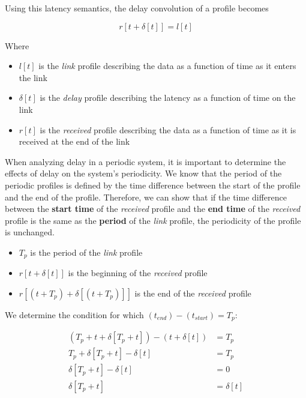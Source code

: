 Using this latency semantics, the delay convolution of a profile
becomes

\begin{equation}
  r[t + \delta[t]] = l[t]
\end{equation}

Where

\begin{itemize}
\item $l[t]$ is the \emph{link} profile describing the data as a
  function of time as it enters the link
\item $\delta[t]$ is the \emph{delay} profile describing the latency
  as a function of time on the link
\item $r[t]$ is the \emph{received} profile describing the data as a
  function of time as it is received at the end of the link
\end{itemize}
  
When analyzing delay in a periodic system, it is important to
determine the effects of delay on the system's periodicity.  We know
that the period of the periodic profiles is defined by the time
difference between the start of the profile and the end of the
profile.  Therefore, we can show that if the time difference between
the \textbf{start time} of the \emph{received} profile and the
\textbf{end time} of the \emph{received} profile is the same as the
\textbf{period} of the \emph{link} profile, the periodicity of the
profile is unchanged.

\begin{itemize}
\item $T_p$ is the period of the \emph{link} profile
\item $r[t + \delta[t]]$ is the beginning of the \emph{received}
  profile
\item $r[(t + T_p) + \delta[(t + T_p)]]$ is the end of the
  \emph{received} profile
\end{itemize}

We determine the condition for which $(t_{end}) - (t_{start}) =
T_p$:

\begin{equation}
  \begin{split}
    (T_p + t + \delta[T_p + t]) - (t + \delta[t]) &= T_p \\
    T_p + \delta[T_p + t] - \delta[t] &= T_p \\
    \delta[T_p + t] - \delta[t] &= 0\\
    \delta[T_p + t] &= \delta[t]
  \end{split}
\end{equation}

